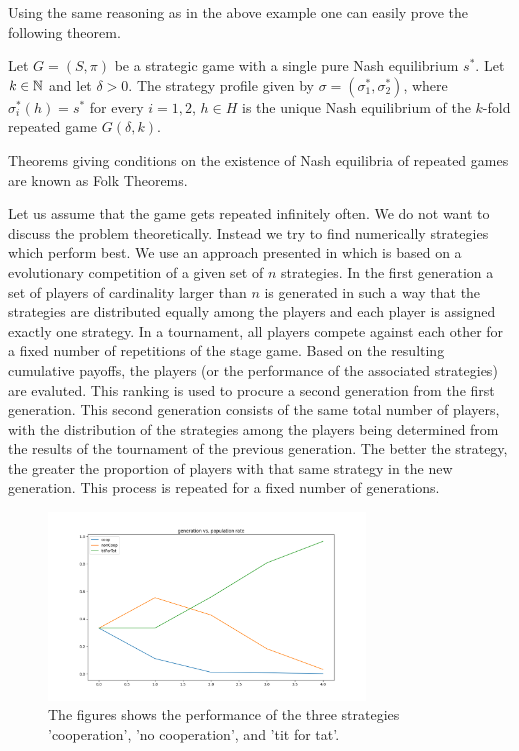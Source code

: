 Using the same reasoning as in the above example one can easily prove the following theorem.
\begin{theorem}
    Let $G = (S, \pi)$ be a strategic game with a single pure Nash equilibrium $s^{*}$. Let $k\in\mathbb{N}$ and let $\delta > 0$. The strategy profile given by
    $\sigma = (\sigma_{1}^{*}, \sigma_{2}^{*})$, where $\sigma_{i}^{*}(h) = s^{*}$ for every $i = 1, 2$, $h\in H$ is the unique Nash equilibrium of the 
    $k$-fold repeated game $G(\delta, k)$.
\end{theorem}

\begin{remark}
    Theorems giving conditions on the existence of Nash equilibria of repeated games are known as Folk Theorems. 
\end{remark}

\begin{example}
    Let us assume that the game gets repeated infinitely often. We do not want to discuss the problem theoretically. Instead we try to find numerically strategies which 
    perform best. We use an approach presented in \cite{mathieu2017new} which is based on a evolutionary competition of a given set of $n$ strategies. In the first generation 
    a set of players of cardinality larger than $n$ is generated in such a way that the strategies are distributed equally among the players and each player is assigned exactly
    one strategy. In a tournament, all players compete against each other for a fixed number of repetitions of the stage game. Based on the resulting cumulative payoffs,
    the players (or the performance of the associated strategies) are evaluted. This ranking is used to procure a second generation from the first generation. This second generation
    consists of the same total number of players, with the distribution of the strategies among the players being determined from the results of the tournament of the previous generation.
    The better the strategy, the greater the proportion of players with that same strategy in the new generation. This process is repeated for a fixed number of generations.
    \begin{figure}[h!]
        \includegraphics[width = 0.75\textwidth]{images/performance_strategies_repeated}
        \centering
        \caption{The figures shows the performance of the three strategies 'cooperation', 'no cooperation', and 'tit for tat'.}
    \end{figure}
\end{example}
